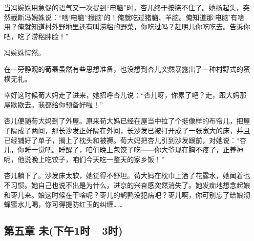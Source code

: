 \par 当冯婉姝用急促的语气又一次提到“电脑”时，杏儿终于按捺不住了。她扬起头，突然截断冯婉姝说：“啥‘电脑’‘猴脑’的！俺就吃过猪脑、羊脑。俺知道那‘电脑’有啥用？俺就知道村外野地里还有叫涝稆的野菜，你吃过吗？赶明儿你吃吃去。告诉你吧，吃了涝稆肿脸！”
\par 冯婉姝愕然。
\par 在一旁静观的荀磊虽然有些思想准备，也没想到杏儿突然暴露出了一种村野式的蛮横无礼。
\par 幸好这时候荀大妈走了进来，她招呼杏儿说：“杏儿呀，你累了吧？走，跟大妈那屋歇歇去。我都给你预备好啦！”
\par 杏儿便随荀大妈到了外屋。原来荀大妈已经在屋当中拉了个挺像样的布帘儿，把屋子隔成了两间，那长沙发正好隔在外间，长沙发已被打开成了一张宽大的床，并且已经铺好了单子，搁上了枕头和被褥。荀大妈把杏儿引到沙发跟前，对她说：“杏儿，你睡一觉吧。睡醒了，咱们晚上包饺子吃——你大爷现在胸不疼了，正养神呢，他说晚上吃饺子，咱们今天吃一整天的家乡饭！”
\par 杏儿躺下了。沙发床太软，她觉得不舒坦。荀大妈在枕巾上洒了花露水，她闻着也不习惯。她自己也说不出是为什么，进京的兴奋感突然消失了。她发痴地想念起娘和枣儿来。娘这时候在干啥呢？枣儿的鹌鹑没犯病吧？枣儿啊，你可别忘了给娘沏蜂蜜水儿喝，你可得提防红玉的纠缠……


\subsection*{第五章 未(下午1时—3时)}

